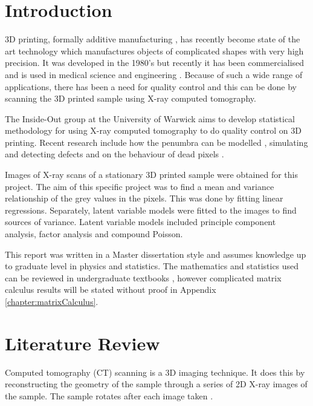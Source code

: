 \documentclass[12pt]{report}
\begin{document}
\tableofcontents

\chapter{Introduction}

3D printing, formally additive manufacturing \cite{wong2012review}, has recently become state of the art technology which manufactures objects of complicated shapes with very high precision. It was developed in the 1980's \cite{kodama1981automatic} but recently it has been commercialised and is used in medical science \cite{kang20163d} and engineering \cite{wong2012review}. Because of such a wide range of applications, there has been a need for quality control and this can be done by scanning the 3D printed sample using X-ray computed tomography.

The Inside-Out group at the University of Warwick aims to develop statistical methodology for using X-ray computed tomography to do quality control on 3D printing. Recent research include how the penumbra can be modelled \cite{kueh2014modelling}, simulating and detecting defects and on the behaviour of dead pixels \cite{brettschneider2014spatial}.

Images of X-ray scans of a stationary 3D printed sample were obtained for this project. The aim of this specific project was to find a mean and variance relationship of the grey values in the pixels. This was done by fitting linear regressions. Separately, latent variable models were fitted to the images to find sources of variance. Latent variable models included principle component analysis, factor analysis and compound Poisson.

This report was written in a Master dissertation style and assumes knowledge up to graduate level in physics and statistics. The mathematics and statistics used can be reviewed in undergraduate textbooks \cite{riley2006mathematical} \cite{rice2009mathematical}, however complicated matrix calculus results will be stated without proof in Appendix \ref{chapter:matrixCalculus}.

\chapter{Literature Review}
Computed tomography (CT) scanning is a 3D imaging technique. It does this by reconstructing the geometry of the sample through a series of 2D X-ray images of the sample. The sample rotates after each image taken \cite{cantatore2011introduction}.
\end{document}
